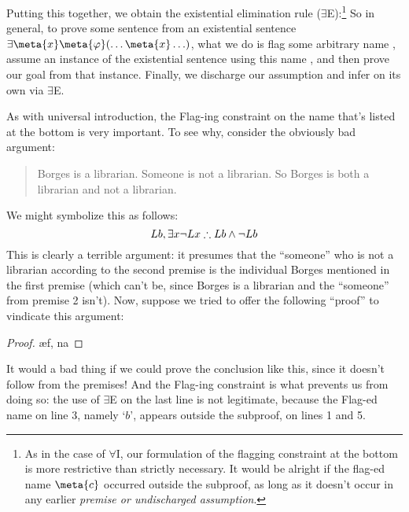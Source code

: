 Putting this together, we obtain the existential elimination rule ($\exists$E):\footnote{As in the case of $\forall$I, our formulation of the flagging constraint at the bottom is more restrictive than strictly necessary.  It would be alright if the flag-ed name $\meta{c}$ occurred outside the subproof, as long as it doesn't occur in any earlier \emph{premise or undischarged assumption}.}
So in general, to prove some sentence \meta{\psi} from an existential sentence $\exists \meta{x}\meta{\varphi}(\ldots \meta{x} \ldots)$, what we do is flag some arbitrary name , assume an instance of the existential sentence using this name , and then prove our goal \meta{\psi} from that instance.  Finally, we discharge our assumption and infer \meta{\psi} on its own via $\exists$E.

As with universal introduction, the Flag-ing constraint on the name  that's listed at the bottom is very important. To see why, consider the obviously bad argument:
	\begin{quote}
		Borges is a librarian. Someone is not a librarian. So Borges is both a librarian and not a librarian. 	\end{quote}
We might symbolize this as follows:
$$Lb, \exists x \neg Lx \therefore Lb \wedge \neg Lb$$
This is clearly a terrible argument: it presumes that the ``someone'' who is not a librarian according to the second premise is the individual Borges mentioned in the first premise (which can't be, since Borges is a librarian and the ``someone'' from premise 2 isn't).  Now, suppose we tried to offer the following ``proof'' to vindicate this argument:
\begin{proof}
	 
	 
	\open
		 
		\ae{f, na}
	\close
\end{proof}
It would a bad thing if we could prove the conclusion like this, since it doesn't follow from the premises!  And the Flag-ing constraint is what prevents us from doing so:  the use of $\exists$E on the last line is not legitimate, because the Flag-ed name on line 3, namely `$b$', appears outside the subproof, on lines 1 and 5.


